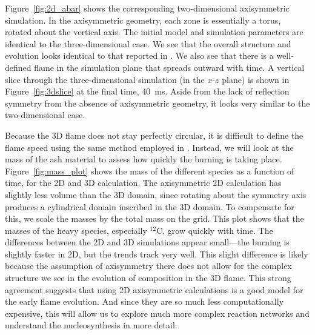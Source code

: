 \documentclass[linenumbers,trackchanges]{aastex631}
\newcommand{\isot}[2]{$^{#2}\mathrm{#1}$}
\begin{document}
\begin{figure*}[t]
\centering
\caption{\label{fig:3dslice} Vertical slices through the three-dimensional
simulation , showing a region centered on the flame viewed from the side.  The
flame structure is clearly seen. }
\end{figure*}


Figure~\ref{fig:2d_abar} shows the corresponding two-dimensional
axisymmetric simulation.  In the axisymmetric geometry, each zone is
essentially a torus, rotated about the vertical axis.  The initial
model and simulation parameters are identical to the three-dimensional
case.  We see that the overall structure and evolution looks identical
to that reported in \cite{harpole:2021}.  We also see that there is a
well-defined flame in the simulation plane that spreads outward with
time.  A vertical slice through the three-dimensional simulation (in
the $x$-$z$ plane) is shown in Figure~\ref{fig:3dslice} at the final
time, 40~ms.  Aside from the lack of reflection symmetry from the
absence of axisymmetric geometry, it looks very similar to the two-dimensional case.







Because the 3D flame does not stay perfectly circular, it is difficult
to define the flame speed using the same method employed in
\citet{eiden:2020}.  Instead, we will look at the mass of the ash
material to assess how quickly the burning is taking place.
Figure~\ref{fig:mass_plot} shows the mass of the different species as
a function of time, for the 2D and 3D calculation.  The axisymmetric
2D calculation has slightly less volume than the 3D domain, since
rotating about the symmetry axis produces a cylindrical domain
inscribed in the 3D domain.  To compensate for this, we scale the
masses by the total mass on the grid.  This plot shows that the
masses of the heavy species, especially \isot{C}{12}, grow quickly
with time.  The differences between the 2D and 3D simulations appear
small---the burning is slightly faster in 2D, but the trends track
very well.  This slight difference is likely because the assumption of
axisymmetry there does not allow for the complex structure we see in
the evolution of composition in the 3D flame.  This strong agreement
suggests that using 2D axisymmetric calculations is a good model for
the early flame evolution.  And since they are so much less
computationally expensive, this will allow us to explore much more
complex reaction networks and understand the nucleosynthesis in more
detail.
\end{document}
